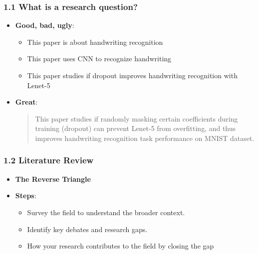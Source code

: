 \documentclass{beamer}
\begin{document}
    \begin{frame}
    \frametitle{1.1 What is a research question?}    
    \begin{itemize}
    
    \item \textbf{Good, bad, ugly}:
    \begin{itemize}
        \item This paper is about handwriting recognition
        \item This paper uses CNN to recognize handwriting
        \item This paper studies if dropout improves handwriting recognition with Lenet-5
    \end{itemize}
    
    \item \textbf{Great}:
    
    \begin{quote}
        This paper studies if randomly masking certain coefficients during training (dropout) can prevent Lenet-5 from overfitting, and thus improves handwriting recognition task performance on MNIST dataset.
    \end{quote}
    
    \end{itemize}
    \end{frame}
    
    
    
    \begin{frame}
    \frametitle{1.2 Literature Review}
    \begin{itemize}
        \item \textbf{The Reverse Triangle}
        \item \textbf{Steps}:
        \begin{itemize}
            \item Survey the field to understand the broader context.
            \item Identify key debates and research gaps.
            \item How your research contributes to the field by closing the gap
        \end{itemize}
    \end{itemize}
    \end{frame}
    
\end{document}
